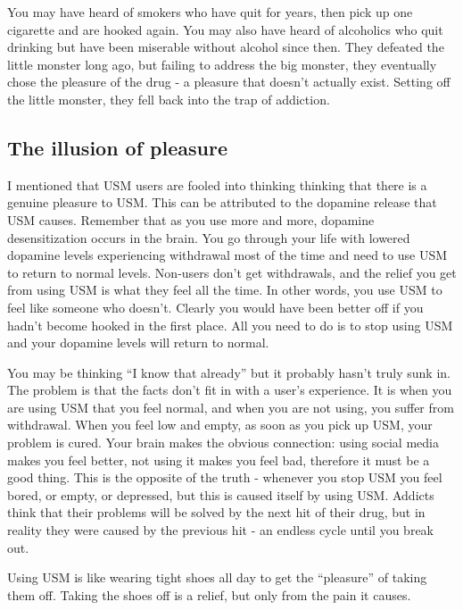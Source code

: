\documentclass[
  openany]{book}
\begin{document}
You may have heard of smokers who have quit for years, then pick up one cigarette and are hooked again. You may also have heard of alcoholics who quit drinking but have been miserable without alcohol since then. They defeated the little monster long ago, but failing to address the big monster, they eventually chose the pleasure of the drug - a pleasure that doesn't actually exist. Setting off the little monster, they fell back into the trap of addiction.

\subsection{The illusion of pleasure}\label{the-illusion-of-pleasure}

I mentioned that USM users are fooled into thinking thinking that there is a genuine pleasure to USM. This can be attributed to the dopamine release that USM causes. Remember that as you use more and more, dopamine desensitization occurs in the brain. You go through your life with lowered dopamine levels experiencing withdrawal most of the time and need to use USM to return to normal levels. Non-users don't get withdrawals, and the relief you get from using USM is what they feel all the time. In other words, you use USM to feel like someone who doesn't. Clearly you would have been better off if you hadn't become hooked in the first place. All you need to do is to stop using USM and your dopamine levels will return to normal.

You may be thinking ``I know that already'' but it probably hasn't truly sunk in. The problem is that the facts don't fit in with a user's experience. It is when you are using USM that you feel normal, and when you are not using, you suffer from withdrawal. When you feel low and empty, as soon as you pick up USM, your problem is cured. Your brain makes the obvious connection: using social media makes you feel better, not using it makes you feel bad, therefore it must be a good thing. This is the opposite of the truth - whenever you stop USM you feel bored, or empty, or depressed, but this is caused itself by using USM. Addicts think that their problems will be solved by the next hit of their drug, but in reality they were caused by the previous hit - an endless cycle until you break out.

Using USM is like wearing tight shoes all day to get the ``pleasure'' of taking them off. Taking the shoes off is a relief, but only from the pain it causes.
\end{document}
